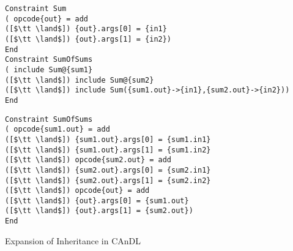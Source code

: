 \begin{lstlisting}[language=CAnDL]
Constraint Sum
( opcode{out} = add
([$\tt \land$]) {out}.args[0] = {in1}
([$\tt \land$]) {out}.args[1] = {in2})
End
Constraint SumOfSums
( include Sum@{sum1}
([$\tt \land$]) include Sum@{sum2}
([$\tt \land$]) include Sum({sum1.out}->{in1},{sum2.out}->{in2}))
End
\end{lstlisting}
\begin{lstlisting}[language=CAnDL]
Constraint SumOfSums
( opcode{sum1.out} = add
([$\tt \land$]) {sum1.out}.args[0] = {sum1.in1}
([$\tt \land$]) {sum1.out}.args[1] = {sum1.in2}
([$\tt \land$]) opcode{sum2.out} = add
([$\tt \land$]) {sum2.out}.args[0] = {sum2.in1}
([$\tt \land$]) {sum2.out}.args[1] = {sum2.in2}
([$\tt \land$]) opcode{out} = add
([$\tt \land$]) {out}.args[0] = {sum1.out}
([$\tt \land$]) {out}.args[1] = {sum2.out})
End
\end{lstlisting}
\vspace{-0.3cm}
\caption{Expansion of Inheritance in CAnDL}